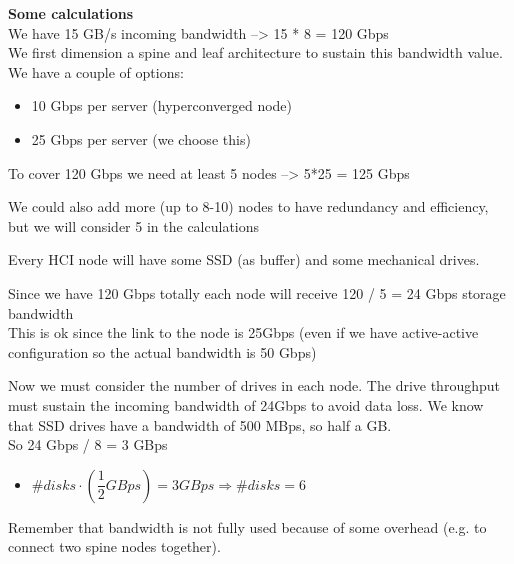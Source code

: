 \textbf{Some calculations}\\
We have 15 GB/s incoming bandwidth --\textgreater{} 15 * 8 = 120 Gbps\\
We first dimension a spine and leaf architecture to sustain this
bandwidth value.\\
We have a couple of options:

\begin{itemize}
\item
  10 Gbps per server (hyperconverged node)
\item
  25 Gbps per server (we choose this)
\end{itemize}

To cover 120 Gbps we need at least 5 nodes --\textgreater{} 5*25 = 125
Gbps

We could also add more (up to 8-10) nodes to have redundancy and
efficiency, but we will consider 5 in the calculations

Every HCI node will have some SSD (as buffer) and some mechanical
drives.

Since we have 120 Gbps totally each node will receive 120 / 5 = 24 Gbps
storage bandwidth\\
This is ok since the link to the node is 25Gbps (even if we have
active-active configuration so the actual bandwidth is 50 Gbps)

Now we must consider the number of drives in each node. The drive
throughput must sustain the incoming bandwidth of 24Gbps to avoid data
loss. We know that SSD drives have a bandwidth of 500 MBps, so half a
GB.\\
So 24 Gbps / 8 = 3 GBps

\begin{itemize}
\item
  $\#disks \cdot (\dfrac{1}{2} GBps) = 3 GBps \Longrightarrow \#disks = 6$
\end{itemize}

Remember that bandwidth is not fully used because of some
overhead (e.g. to connect two spine nodes together).


